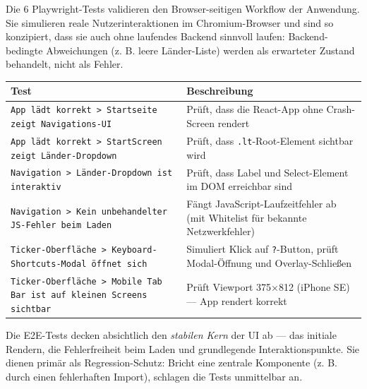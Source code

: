 Die 6 Playwright-Tests validieren den Browser-seitigen Workflow der
Anwendung. Sie simulieren reale Nutzerinteraktionen im Chromium-Browser
und sind so konzipiert, dass sie auch ohne laufendes Backend sinnvoll
laufen: Backend-bedingte Abweichungen (z. B. leere Länder-Liste) werden
als erwarteter Zustand behandelt, nicht als Fehler.

{\def\LTcaptype{none} %
\begin{longtable}[]{@{}
  >{\raggedright\arraybackslash}p{}
  >{\raggedright\arraybackslash}p{}@{}}
\toprule\noalign{}
\begin{minipage}[b]{\linewidth}\raggedright
Test
\end{minipage} & \begin{minipage}[b]{\linewidth}\raggedright
Beschreibung
\end{minipage} \\
\midrule\noalign{}
\endhead
\bottomrule\noalign{}
\endlastfoot
\passthrough{\lstinline!App lädt korrekt > Startseite zeigt Navigations-UI!}
& Prüft, dass die React-App ohne Crash-Screen rendert \\
\passthrough{\lstinline!App lädt korrekt > StartScreen zeigt Länder-Dropdown!}
& Prüft, dass \passthrough{\lstinline!.lt!}-Root-Element sichtbar
wird \\
\passthrough{\lstinline!Navigation > Länder-Dropdown ist interaktiv!} &
Prüft, dass Label und Select-Element im DOM erreichbar sind \\
\passthrough{\lstinline!Navigation > Kein unbehandelter JS-Fehler beim Laden!}
& Fängt JavaScript-Laufzeitfehler ab (mit Whitelist für bekannte
Netzwerkfehler) \\
\passthrough{\lstinline!Ticker-Oberfläche > Keyboard-Shortcuts-Modal öffnet sich!}
& Simuliert Klick auf \passthrough{\lstinline!?!}-Button, prüft
Modal-Öffnung und Overlay-Schließen \\
\passthrough{\lstinline!Ticker-Oberfläche > Mobile Tab Bar ist auf kleinen Screens sichtbar!}
& Prüft Viewport 375×812 (iPhone SE) --- App rendert korrekt \\
\end{longtable}
}

Die E2E-Tests decken absichtlich den \emph{stabilen Kern} der UI ab ---
das initiale Rendern, die Fehlerfreiheit beim Laden und grundlegende
Interaktionspunkte. Sie dienen primär als Regression-Schutz: Bricht eine
zentrale Komponente (z. B. durch einen fehlerhaften Import), schlagen
die Tests unmittelbar an.


